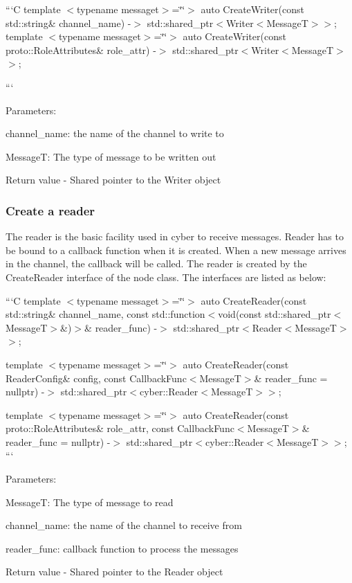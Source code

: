 ```\-C template $<$typename messaget$>$=\char`\"{}\char`\"{}$>$ auto Create\-Writer(const std\-::string\& channel\-\_\-name) -\/$>$ std\-::shared\-\_\-ptr$<$Writer$<$\-Message\-T$>$$>$; template $<$typename messaget$>$=\char`\"{}\char`\"{}$>$ auto Create\-Writer(const proto\-::\-Role\-Attributes\& role\-\_\-attr) -\/$>$ std\-::shared\-\_\-ptr$<$Writer$<$\-Message\-T$>$$>$;

```
\begin{DoxyItemize}
\item Parameters\-:
\begin{DoxyItemize}
\item channel\-\_\-name\-: the name of the channel to write to
\item Message\-T\-: The type of message to be written out
\end{DoxyItemize}
\item Return value -\/ Shared pointer to the Writer object
\end{DoxyItemize}

\subsubsection*{Create a reader}

The reader is the basic facility used in cyber to receive messages. Reader has to be bound to a callback function when it is created. When a new message arrives in the channel, the callback will be called. The reader is created by the {\ttfamily Create\-Reader} interface of the node class. The interfaces are listed as below\-:

```\-C template $<$typename messaget$>$=\char`\"{}\char`\"{}$>$ auto Create\-Reader(const std\-::string\& channel\-\_\-name, const std\-::function$<$void(const std\-::shared\-\_\-ptr$<$\-Message\-T$>$\&)$>$\& reader\-\_\-func) -\/$>$ std\-::shared\-\_\-ptr$<$Reader$<$\-Message\-T$>$$>$;

template $<$typename messaget$>$=\char`\"{}\char`\"{}$>$ auto Create\-Reader(const Reader\-Config\& config, const Callback\-Func$<$\-Message\-T$>$\& reader\-\_\-func = nullptr) -\/$>$ std\-::shared\-\_\-ptr$<$cyber\-::\-Reader$<$\-Message\-T$>$$>$;

template $<$typename messaget$>$=\char`\"{}\char`\"{}$>$ auto Create\-Reader(const proto\-::\-Role\-Attributes\& role\-\_\-attr, const Callback\-Func$<$\-Message\-T$>$\& reader\-\_\-func = nullptr) -\/$>$ std\-::shared\-\_\-ptr$<$cyber\-::\-Reader$<$\-Message\-T$>$$>$; ```
\begin{DoxyItemize}
\item Parameters\-:
\begin{DoxyItemize}
\item Message\-T\-: The type of message to read
\item channel\-\_\-name\-: the name of the channel to receive from
\item reader\-\_\-func\-: callback function to process the messages
\end{DoxyItemize}
\item Return value -\/ Shared pointer to the Reader object
\end{DoxyItemize}

